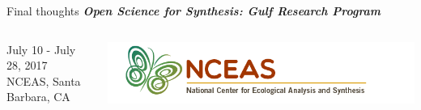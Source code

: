 \documentclass[serif]{beamer}\usepackage[]{graphicx}\usepackage[]{color}
\newcommand{\emtxt}[1]{\textbf{\textit{{\color{mypal4} #1}}}}
\begin{document}
\begin{frame}[t]{Final thoughts}{}
{\large \emtxt{Open Science for Synthesis: Gulf Research Program}}
\begin{columns}
\begin{column}{0.5\textwidth}
July 10 - July 28, 2017\\
NCEAS, Santa Barbara, CA 
\end{column}
\begin{column}{0.5\textwidth}
\hfill \includegraphics[width = \textwidth]{fig/nceas_full.png}
\end{column}
\end{columns}
\vspace{0.1in}
\begin{columns}
\begin{column}{0.5\textwidth}
\centerline{}
\end{column}
\begin{column}{0.5\textwidth}
\centerline{}
\end{column}
\end{columns}
\end{frame}
\end{document}
